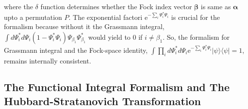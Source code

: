 \documentclass[notitlepage,onecolumn,showpacs,11pt]{revtex4-1}
\begin{document}
where the $\delta$ function determines whether the Fock index vector $ \bm{\beta}$ is same as $ \bm{\alpha}$ upto a
permutation $P$. The exponential factori $ \text{e}^{-\sum_i\Psi^*_i\Psi_i}$ is crucial for the formalism because without 
it the Grassmann integral, $ \int d\Psi^*_id\Psi_i\left(1-\Psi^*_i\Psi_i\right)\Psi_{\beta_1}\Psi^*_{\beta_1}$ would 
yield to $0$ if $ i\neq \beta_1$. So, the formalism for Grassmann integral and the Fock-space identity, 
$\int \prod_id\Psi^*_id\Psi_i\text{e}^{-\sum_i\Psi^*_i\Psi_i}|\psi\rangle\langle\psi|=1$, remains internally consistent.

\subsection{The Functional Integral Formalism and The Hubbard-Stratanovich Transformation}
\end{document}
